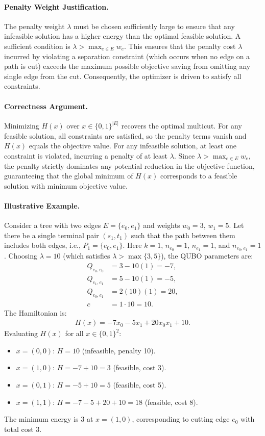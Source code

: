 \documentclass[12pt]{article}
\begin{document}
\paragraph{Penalty Weight Justification.}
The penalty weight $\lambda$ must be chosen sufficiently large to ensure that any infeasible solution has a higher energy than the optimal feasible solution. A sufficient condition is $\lambda > \max_{e \in E} w_e$. This ensures that the penalty cost $\lambda$ incurred by violating a separation constraint (which occurs when no edge on a path is cut) exceeds the maximum possible objective saving from omitting any single edge from the cut. Consequently, the optimizer is driven to satisfy all constraints.

\paragraph{Correctness Argument.}
Minimizing $H(x)$ over $x \in \{0,1\}^{|E|}$ recovers the optimal multicut. For any feasible solution, all constraints are satisfied, so the penalty terms vanish and $H(x)$ equals the objective value. For any infeasible solution, at least one constraint is violated, incurring a penalty of at least $\lambda$. Since $\lambda > \max_{e \in E} w_e$, the penalty strictly dominates any potential reduction in the objective function, guaranteeing that the global minimum of $H(x)$ corresponds to a feasible solution with minimum objective value.

\paragraph{Illustrative Example.}
Consider a tree with two edges $E = \{e_0, e_1\}$ and weights $w_0 = 3$, $w_1 = 5$. Let there be a single terminal pair $(s_1, t_1)$ such that the path between them includes both edges, i.e., $P_1 = \{e_0, e_1\}$. Here $k=1$, $n_{e_0} = 1$, $n_{e_1} = 1$, and $n_{e_0, e_1} = 1$. Choosing $\lambda = 10$ (which satisfies $\lambda > \max\{3, 5\}$), the QUBO parameters are:
\begin{align}
    Q_{e_0, e_0} &= 3 - 10(1) = -7, \\
    Q_{e_1, e_1} &= 5 - 10(1) = -5, \\
    Q_{e_0, e_1} &= 2(10)(1) = 20, \\
    c &= 1 \cdot 10 = 10.
\end{align}
The Hamiltonian is:
\begin{align}
    H(x) = -7x_0 - 5x_1 + 20x_0 x_1 + 10.
\end{align}
Evaluating $H(x)$ for all $x \in \{0,1\}^2$:
\begin{itemize}
    \item $x=(0,0)$: $H = 10$ (infeasible, penalty 10).
    \item $x=(1,0)$: $H = -7 + 10 = 3$ (feasible, cost 3).
    \item $x=(0,1)$: $H = -5 + 10 = 5$ (feasible, cost 5).
    \item $x=(1,1)$: $H = -7 - 5 + 20 + 10 = 18$ (feasible, cost 8).
\end{itemize}
The minimum energy is $3$ at $x=(1,0)$, corresponding to cutting edge $e_0$ with total cost $3$.
\end{document}
